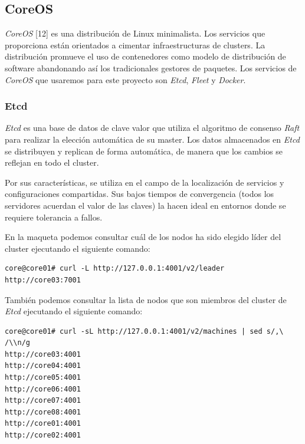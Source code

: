 \documentclass[a4paper,12pt,spanish,final]{epsc_tfc_pfc}
\begin{document}
\subsection{CoreOS}

\emph{CoreOS} [12] es una distribución de Linux minimalista. Los servicios que proporciona están orientados a cimentar infraestructuras de clusters. La distribución promueve el uso de contenedores como modelo de distribución de software abandonando así los tradicionales gestores de paquetes. Los servicios de \emph{CoreOS} que usaremos para este proyecto son \emph{Etcd}, \emph{Fleet} y \emph{Docker}.

\subsubsection{Etcd}

\emph{Etcd} es una base de datos de clave valor que utiliza el algoritmo de consenso \emph{Raft} para realizar la elección automática de su master. Los datos almacenados en \emph{Etcd} se distribuyen y replican de forma automática, de manera que los cambios se reflejan en todo el cluster.

Por sus características, se utiliza en el campo de la localización de servicios y configuraciones compartidas. Sus bajos tiempos de convergencia (todos los servidores acuerdan el valor de las claves) la hacen ideal en entornos donde se requiere tolerancia a fallos.

En la maqueta podemos consultar cuál de los nodos ha sido elegido líder del cluster ejecutando el siguiente comando:\\

\begin{lstlisting}[style=dnsmasq]
core@core01# curl -L http://127.0.0.1:4001/v2/leader
http://core03:7001
\end{lstlisting}

También podemos consultar la lista de nodos que son miembros del cluster de \emph{Etcd} ejecutando el siguiente comando:\\

\begin{lstlisting}[style=dnsmasq]
core@core01# curl -sL http://127.0.0.1:4001/v2/machines | sed s/,\ /\\n/g
http://core03:4001
http://core04:4001
http://core05:4001
http://core06:4001
http://core07:4001
http://core08:4001
http://core01:4001
http://core02:4001
\end{lstlisting}
\end{document}
